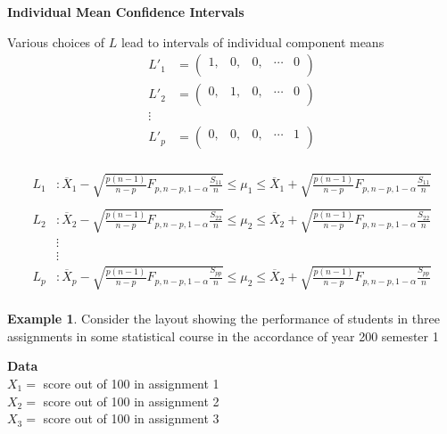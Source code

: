 \documentclass[11pt,a4paper]{article}
\theoremstyle{definition}
\newtheorem{exa}[thm]{Example}
\begin{document}
\begin{center}
\textbf{Individual Mean Confidence Intervals}
\end{center}
Various choices of $L$ lead to intervals of individual component means
\begin{align*}
L'_1 & = 
\begin{pmatrix}
1, & 0, & 0, & \cdots& 0\\
\end{pmatrix}\\
L'_2 & = \begin{pmatrix}
0, & 1, & 0, & \cdots& 0\\
\end{pmatrix}\\
\vdots & \\
L'_p & = \begin{pmatrix}
0, & 0, & 0, & \cdots& 1\\
\end{pmatrix}\\
\end{align*}



\begin{align*}
L_1 & : \overline{X}_1-\sqrt{\frac{p(n-1)}{n-p}F_{p,n-p,1-\alpha}\frac{S_{11}}{n}}\leq \mu_1\leq \overline{X}_1+ \sqrt{\frac{p(n-1)}{n-p}F_{p,n-p,1-\alpha}\frac{S_{11}}{n}}\\\\
L_2 & : \overline{X}_2-\sqrt{\frac{p(n-1)}{n-p}F_{p,n-p,1-\alpha}\frac{S_{22}}{n}}\leq \mu_2\leq \overline{X}_2+ \sqrt{\frac{p(n-1)}{n-p}F_{p,n-p,1-\alpha}\frac{S_{22}}{n}}\\
& \vdots \\
& \vdots \\
L_p & : \overline{X}_p-\sqrt{\frac{p(n-1)}{n-p}F_{p,n-p,1-\alpha}\frac{S_{pp}}{n}}\leq \mu_2\leq \overline{X}_2+ \sqrt{\frac{p(n-1)}{n-p}F_{p,n-p,1-\alpha}\frac{S_{pp}}{n}}\\
\end{align*}



\begin{exa}
Consider the layout showing the performance of students in three assignments in some statistical course in the accordance of year 200 semester 1\\
\end{exa}

\textbf{Data}\\
$X_1=$ score out of 100 in assignment 1\\
$X_2=$ score out of 100 in assignment 2\\
$X_3=$ score out of 100 in assignment 3\\
\end{document}
